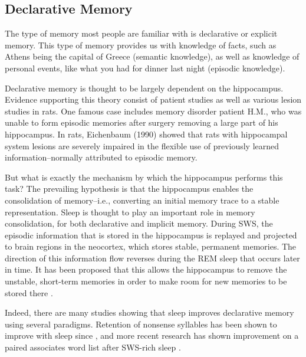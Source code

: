 \documentclass[10pt,letterpaper]{article}
\begin{document}
\subsection{Declarative Memory}

The type of memory most people are familiar with is declarative or explicit memory. This type of memory provides us with knowledge of facts, such as Athens being the capital of Greece (semantic knowledge), as well as knowledge of personal events, like what you had for dinner last night (episodic knowledge). 

Declarative memory is thought to be largely dependent on the hippocampus. Evidence supporting this theory consist of patient studies as well as various lesion studies in rats. One famous case includes memory disorder patient H.M., who was unable to form episodic memories after surgery removing a large part of his hippocampus. In rats, Eichenbaum (1990) showed that rats with hippocampal system lesions are severely impaired in the flexible use of previously learned information--normally attributed to episodic memory.

But what is exactly the mechanism by which the hippocampus performs this task? The prevailing hypothesis is that the hippocampus enables the consolidation of memory--i.e., converting an initial memory trace to a stable representation. Sleep is thought to play an important role in memory consolidation, for both declarative and implicit memory. During SWS, the episodic information that is stored in the hippocampus is replayed and projected to brain regions in the neocortex, which stores stable, permanent memories. The direction of this information flow reverses during the REM sleep that occurs later in time. It has been proposed that this allows the hippocampus to remove the unstable, short-term memories in order to make room for new memories to be stored there \cite{Wamsley:2011}.

Indeed, there are many studies showing that sleep improves declarative memory using several paradigms. Retention of nonsense syllables has been shown to improve with sleep since \cite{Jenkins:1924}, and more recent research has shown improvement on a paired associates word list after SWS-rich sleep \cite{Gais:2004}. 
\end{document}
